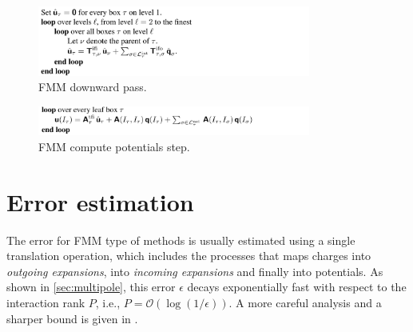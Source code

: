 \documentclass[final,onefignum,onetabnum]{siamart220329}
\newcommand{\Ocal}{\mathcal{O}}
\begin{document}
\begin{figure}[h!]
	\centering
	\includegraphics[width=0.8\textwidth]{downfmm}
	\caption{FMM downward pass.}
	\label{fig:downfmm}
\end{figure}
\begin{figure}[h!]
	\centering
	\includegraphics[width=0.8\textwidth]{potfmm}
	\caption{FMM compute potentials step.}
	\label{fig:potfmm}
\end{figure}

\section{Error estimation}
The error for FMM type of methods is usually estimated using a single translation operation, which includes the processes that maps charges into \textit{outgoing expansions}, into \textit{incoming expansions} and finally into potentials. As shown in \cref{sec:multipole}, this error $\epsilon$ decays exponentially fast with respect to the interaction rank $P$, i.e., $P=\Ocal(\log(1/\epsilon))$. A more careful analysis and a sharper bound is given in \cite{petersen1995error}. 
\end{document}
